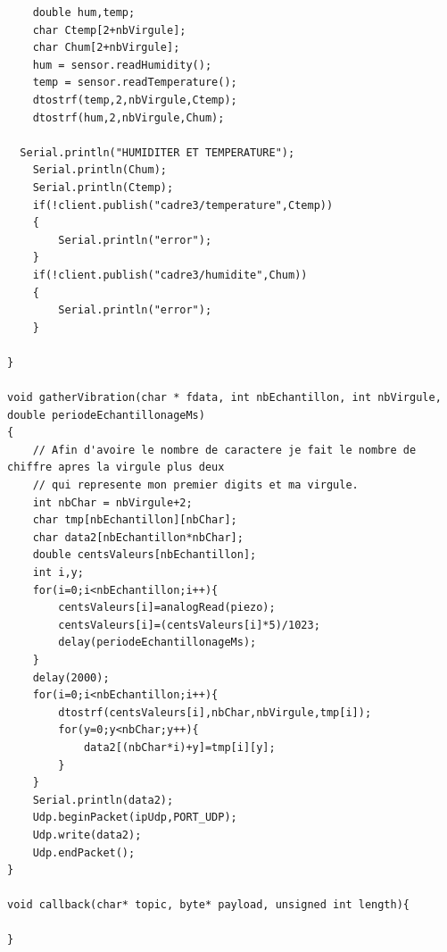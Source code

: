 \documentclass[12pt,french,a4paper]{article}
\begin{document}
\begin{scriptsize}
\begin{lstlisting}
	double hum,temp;
	char Ctemp[2+nbVirgule];
	char Chum[2+nbVirgule];
	hum = sensor.readHumidity();
	temp = sensor.readTemperature();
	dtostrf(temp,2,nbVirgule,Ctemp);
	dtostrf(hum,2,nbVirgule,Chum);
  
  Serial.println("HUMIDITER ET TEMPERATURE");
	Serial.println(Chum);
	Serial.println(Ctemp);
	if(!client.publish("cadre3/temperature",Ctemp))
	{
		Serial.println("error");
	}
	if(!client.publish("cadre3/humidite",Chum))
	{
		Serial.println("error");
	}

}

void gatherVibration(char * fdata, int nbEchantillon, int nbVirgule, double periodeEchantillonageMs)
{
	// Afin d'avoire le nombre de caractere je fait le nombre de chiffre apres la virgule plus deux
	// qui represente mon premier digits et ma virgule.
	int nbChar = nbVirgule+2;
	char tmp[nbEchantillon][nbChar];
	char data2[nbEchantillon*nbChar];
	double centsValeurs[nbEchantillon];
	int i,y;
	for(i=0;i<nbEchantillon;i++){
		centsValeurs[i]=analogRead(piezo);
		centsValeurs[i]=(centsValeurs[i]*5)/1023;
		delay(periodeEchantillonageMs);
	}
	delay(2000);
	for(i=0;i<nbEchantillon;i++){
		dtostrf(centsValeurs[i],nbChar,nbVirgule,tmp[i]);
		for(y=0;y<nbChar;y++){
			data2[(nbChar*i)+y]=tmp[i][y];
		}	
	}
	Serial.println(data2);
	Udp.beginPacket(ipUdp,PORT_UDP);
	Udp.write(data2);
	Udp.endPacket();
}

void callback(char* topic, byte* payload, unsigned int length){

}
\end{lstlisting}
\end{scriptsize} 
\end{document}
